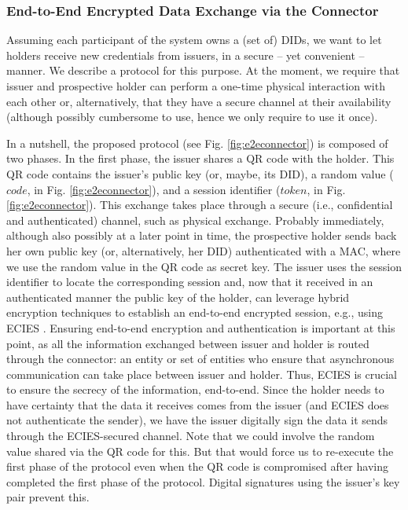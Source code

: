 \documentclass[10pt,a4paper]{article}
\newcommand{\figref}[1]{Fig. \ref{#1}}
\begin{document}
\subsubsection{End-to-End Encrypted Data Exchange via the Connector}
\label{sssec:e2eeconnector}

Assuming each participant of the system owns a (set of) DIDs, we want to let
holders receive new credentials from issuers, in a secure -- yet convenient --
manner. We describe a protocol for this purpose.  At the moment, we require
that issuer and prospective holder can perform a one-time physical interaction
with each other or, alternatively, that they have a secure channel at their
availability (although possibly cumbersome to use, hence we only require to use
it once).

In a nutshell, the proposed protocol (see \figref{fig:e2econnector}) is composed
of two phases. In the first phase, the issuer shares a QR code with the holder.
This QR code contains the issuer's public key (or, maybe, its DID), a random
value ($code$, in \figref{fig:e2econnector}), and a session identifier ($token$,
in \figref{fig:e2econnector}). This exchange takes place through a secure (i.e.,
confidential and authenticated) channel, such as physical exchange. Probably
immediately, although also possibly at a later point in time, the prospective
holder sends back her own public key (or, alternatively, her DID) authenticated
with a MAC, where we use the random value
in the QR code as secret key. The issuer uses the session identifier to locate
the corresponding session and, now that it received in an authenticated manner
the public key of the holder, can leverage hybrid encryption techniques to
establish an end-to-end encrypted session, e.g., using ECIES \cite{abr01}.
Ensuring end-to-end encryption and authentication is important at this point, as
all the information exchanged between issuer and holder is routed through the
connector: an entity or set of entities who ensure that asynchronous
communication can take place between issuer and holder. Thus, ECIES is crucial
to ensure the secrecy of the information, end-to-end. Since the holder needs to
have certainty that the data it receives comes from the issuer (and ECIES does
not authenticate the sender), we have the issuer digitally sign the data it
sends through the ECIES-secured channel. Note that we could involve the random
value shared via the QR code for this. But that would force us to re-execute the
first phase of the protocol even when the QR code is compromised after having
completed the first phase of the protocol. Digital signatures using the issuer's
key pair prevent this.
\end{document}
